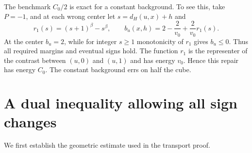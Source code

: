 \documentclass[11pt]{article}
\newcommand{\1}{\mathbf 1}
\begin{document}
The benchmark $C_0/2$ is exact for a constant background. To see this,
take $P=-1$, and at each wrong center let $s=d_H(u,x)+h$ and
\[
 r_1(s)=(s+1)^\beta-s^\beta,\qquad
 b_u(x,h)=2-\frac2{v_0}+\frac2{v_0}r_1(s).
\]
At the center $b_u=2$, while for integer $s\ge1$ monotonicity of
$r_1$ gives $b_u\le0$. Thus all required margins and eventual signs
hold. The function $r_1$ is the representer of the contrast between
$(u,0)$ and $(u,1)$ and has energy $v_0$. Hence this repair has energy
$C_0$. The constant background errs on half the cube.

\section{A dual inequality allowing all sign changes}
We first establish the geometric estimate used in the transport proof.
\end{document}
